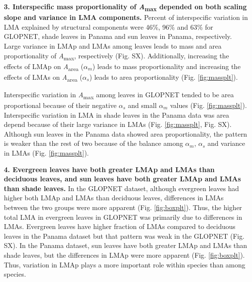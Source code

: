 \documentclass[
  12pt,
]{article}
\providecommand{\DIFaddtex}[1]{{\protect\color{blue}\uwave{#1}}} %
\providecommand{\DIFdeltex}[1]{{\protect\color{red}\sout{#1}}}                      %
\providecommand{\DIFaddbegin}{} %
\providecommand{\DIFaddend}{} %
\providecommand{\DIFdelbegin}{} %
\providecommand{\DIFdelend}{} %
\providecommand{\DIFadd}[1]{\texorpdfstring{\DIFaddtex{#1}}{#1}} %
\providecommand{\DIFdel}[1]{\texorpdfstring{\DIFdeltex{#1}}{}} %
\newcommand{\DIFscaledelfig}{0.5}
\newlength{\DIFdelgraphicswidth} %
\newlength{\DIFdelgraphicsheight} %
\newcommand{\DIFaddincludegraphics}[2][]{{\color{blue}\fbox{\DIFOincludegraphics[#1]{#2}}}} %
\newcommand{\DIFdelincludegraphics}[2][]{%
\sbox{\DIFdelgraphicsbox}{\DIFOincludegraphics[#1]{#2}}%
\settoboxwidth{\DIFdelgraphicswidth}{\DIFdelgraphicsbox} %
\settoboxtotalheight{\DIFdelgraphicsheight}{\DIFdelgraphicsbox} %
\scalebox{\DIFscaledelfig}{%
\parbox[b]{\DIFdelgraphicswidth}{\usebox{\DIFdelgraphicsbox}\\[-\baselineskip] \rule{\DIFdelgraphicswidth}{0em}}\llap{\resizebox{\DIFdelgraphicswidth}{\DIFdelgraphicsheight}{%
\setlength{\unitlength}{\DIFdelgraphicswidth}%
\begin{picture}(1,1)%
\thicklines\linethickness{2pt} %
{\color[rgb]{1,0,0}\put(0,0){\framebox(1,1){}}}%
{\color[rgb]{1,0,0}\put(0,0){\line( 1,1){1}}}%
{\color[rgb]{1,0,0}\put(0,1){\line(1,-1){1}}}%
\end{picture}%
}\hspace*{3pt}}} %
} %
\DeclareRobustCommand{\DIFaddbegin}{\DIFOaddbegin \let\includegraphics\DIFaddincludegraphics} %
\DeclareRobustCommand{\DIFaddend}{\DIFOaddend \let\includegraphics\DIFOincludegraphics} %
\DeclareRobustCommand{\DIFdelbegin}{\DIFOdelbegin \let\includegraphics\DIFdelincludegraphics} %
\DeclareRobustCommand{\DIFdelend}{\DIFOaddend \let\includegraphics\DIFOincludegraphics} %
\begin{document}
\textbf{3. Interspecific mass proportionality of \emph{A}\textsubscript{max} depended on both scaling slope and variance in LMA components.}
Percent of interspecific variation in LMA explained by structural components were 46\%, 96\% and 63\% for GLOPNET, shade leaves in Panama and sun leaves in Panama, respectively.
Large variance in LMAp and LMAs among leaves leads to mass and area proportionality of \emph{A}\textsubscript{max}, respectively (Fig. SX). Additionally, increasing the effects of LMAp on \emph{A}\textsubscript{area} (\DIFdelbegin \DIFdel{\(\alpha_m\)}\DIFdelend \DIFaddbegin \DIFadd{\(\alpha_p\)}\DIFaddend ) leads to mass proportionality and increasing the effects of LMAs on \emph{A}\textsubscript{area} (\(\alpha_s\)) leads to area proportionality (Fig. \DIFaddbegin \DIFadd{Fig.~}\DIFaddend \ref{fig:massplt}).

Interspecific variation in \emph{A}\textsubscript{max} among leaves in GLOPNET tended to be area proportional because of their negative \(\alpha_s\) and small \DIFdelbegin \DIFdel{\(\alpha_m\) }\DIFdelend \DIFaddbegin \DIFadd{\(\alpha_p\) }\DIFaddend values (Fig. \DIFaddbegin \DIFadd{Fig.~}\DIFaddend \ref{fig:massplt}).
Interspecific variation in LMA in shade leaves in the Panama data was area depend because of their large variance in LMAs (Fig. \DIFaddbegin \DIFadd{Fig.~}\DIFaddend \ref{fig:massplt}, Fig. SX).
Although sun leaves in the Panama data showed area proportionality, the
pattern is weaker than the rest of two because of the balance among \DIFdelbegin \DIFdel{\(\alpha_m\)}\DIFdelend \DIFaddbegin \DIFadd{\(\alpha_p\)}\DIFaddend , \(\alpha_s\) and variance in LMAs (Fig. \DIFaddbegin \DIFadd{Fig.~}\DIFaddend \ref{fig:massplt}).

\textbf{4. Evergreen leaves have both greater LMAp and LMAs than deciduous leaves, and sun leaves have both greater LMAp and LMAs than shade leaves.}
In the GLOPNET dataset, although evergreen leaves had higher both LMAp and LMAs than deciduous leaves, differences in LMAs between the two groups were more apparent (Fig. \DIFaddbegin \DIFadd{Fig.~}\DIFaddend \ref{fig:boxplt}).
Thus, the higher total LMA in evergreen leaves in GLOPNET was primarily due to differences in LMAs.
Evergreen leaves have higher fraction of LMAs compared to deciduous leaves in the Panama dataset but that pattern was weak in the GLOPNET (Fig. SX).
In the Panama dataset, sun leaves have both greater LMAp and LMAs than shade leaves, but the differences in LMAp were more apparent (Fig. \DIFaddbegin \DIFadd{Fig.~}\DIFaddend \ref{fig:boxplt}).
Thus, variation in LMAp plays a more important role within species than among species.
\end{document}
